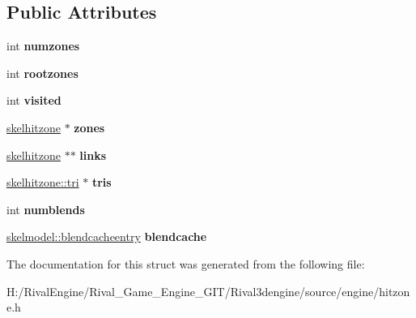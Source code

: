 \subsection*{Public Attributes}
\begin{DoxyCompactItemize}
\item 
\mbox{\label{structskelhitdata_aab1c7a3648852bd498f587c2d78157bc}} 
int {\bfseries numzones}
\item 
\mbox{\label{structskelhitdata_a05fb3fa1da8f1106c6ca03e1140f7243}} 
int {\bfseries rootzones}
\item 
\mbox{\label{structskelhitdata_ac0205abfb53e82dad02c759726929828}} 
int {\bfseries visited}
\item 
\mbox{\label{structskelhitdata_a4735feee2706953adea90b8dcbb38a23}} 
\hyperlink{structskelhitzone}{skelhitzone} $\ast$ {\bfseries zones}
\item 
\mbox{\label{structskelhitdata_a7d6a963713808ee647e9325ff8a738f7}} 
\hyperlink{structskelhitzone}{skelhitzone} $\ast$$\ast$ {\bfseries links}
\item 
\mbox{\label{structskelhitdata_a20d9adb457fb8e0702db06fa0f4634c6}} 
\hyperlink{structskelbih_1_1tri}{skelhitzone\+::tri} $\ast$ {\bfseries tris}
\item 
\mbox{\label{structskelhitdata_a5f6df56fcac77dbf67c58f638e28132c}} 
int {\bfseries numblends}
\item 
\mbox{\label{structskelhitdata_ae1168a23a734716242cdb433742fe3a1}} 
\hyperlink{structskelmodel_1_1blendcacheentry}{skelmodel\+::blendcacheentry} {\bfseries blendcache}
\end{DoxyCompactItemize}


The documentation for this struct was generated from the following file\+:\begin{DoxyCompactItemize}
\item 
H\+:/\+Rival\+Engine/\+Rival\+\_\+\+Game\+\_\+\+Engine\+\_\+\+G\+I\+T/\+Rival3dengine/source/engine/hitzone.\+h\end{DoxyCompactItemize}
